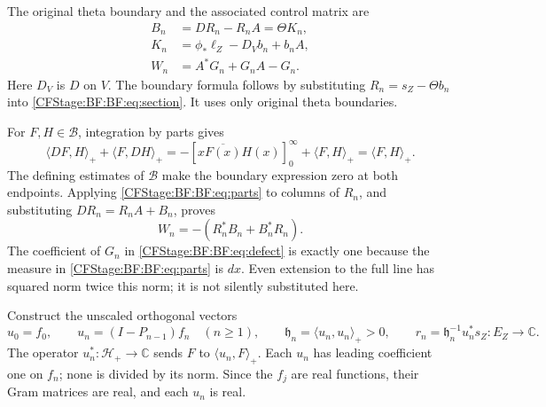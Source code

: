 The original theta boundary and the associated control matrix are
\begin{equation}
\begin{split}
B_n&=DR_n-R_nA=\Theta K_n,\\
K_n&=\phi_*\ell_Z-D_Vb_n+b_nA,\\
W_n&=A^*G_n+G_nA-G_n.
\end{split}
\tag{BF.10}\label{CFStage:BF:BF:eq:defect}
\end{equation}
Here \(D_V\) is \(D\) on \(V\).  The boundary formula follows by
substituting \(R_n=s_Z-\Theta b_n\) into
\eqref{CFStage:BF:BF:eq:section}.  It uses only original theta boundaries.

For \(F,H\in\mathcal B\), integration by parts gives
\begin{equation}
\langle DF,H\rangle_++\langle F,DH\rangle_+
=-\left[x\overline{F(x)}H(x)\right]_{0}^{\infty}
 +\langle F,H\rangle_+
=\langle F,H\rangle_+.
\tag{BF.11}\label{CFStage:BF:BF:eq:parts}
\end{equation}
The defining estimates of \(\mathcal B\) make the boundary expression
zero at both endpoints.  Applying \eqref{CFStage:BF:BF:eq:parts} to columns of
\(R_n\), and substituting \(DR_n=R_nA+B_n\), proves
\begin{equation}
W_n=-(R_n^*B_n+B_n^*R_n).
\tag{BF.12}\label{CFStage:BF:BF:eq:cross-defect}
\end{equation}
The coefficient of \(G_n\) in \eqref{CFStage:BF:BF:eq:defect} is exactly one
because the measure in \eqref{CFStage:BF:BF:eq:parts} is \(dx\).
Even extension to the full line has squared norm twice this norm;
it is not silently substituted here.

Construct the unscaled orthogonal vectors
\begin{equation}
u_0=f_0,\qquad
u_n=(I-P_{n-1})f_n\quad(n\ge1),\qquad
\mathfrak h_n=\langle u_n,u_n\rangle_+>0,\qquad
r_n=\mathfrak h_n^{-1}u_n^*s_Z:E_Z\to\mathbb C.
\tag{BF.13}\label{CFStage:BF:BF:eq:unscaled-rows}
\end{equation}
The operator \(u_n^*:\mathcal H_+\to\mathbb C\) sends \(F\) to
\(\langle u_n,F\rangle_+\).  Each \(u_n\) has leading coefficient
one on \(f_n\); none is divided by its norm.  Since the \(f_j\) are
real functions, their Gram matrices are real, and each \(u_n\) is
real.

